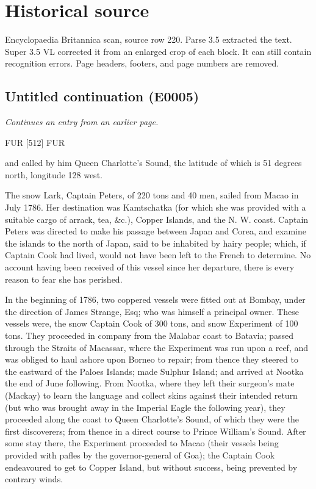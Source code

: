 \documentclass{article}
\begin{document}
\section*{Historical source}
Encyclopaedia Britannica scan, source row 220. Parse 3.5 extracted the text. Super 3.5 VL corrected it from an enlarged crop of each block. It can still contain recognition errors.
Page headers, footers, and page numbers are removed.

\subsection*{Untitled continuation (E0005)}
\textit{Continues an entry from an earlier page.}

FUR [512] FUR

and called by him Queen Charlotte's Sound, the latitude of which is 51 degrees north, longitude 128 west.

The snow Lark, Captain Peters, of 220 tons and 40 men, sailed from Macao in July 1786. Her destination was Kamtschatka (for which she was provided with a suitable cargo of arrack, tea, \&c.), Copper Islands, and the N. W. coast. Captain Peters was directed to make his passage between Japan and Corea, and examine the islands to the north of Japan, said to be inhabited by hairy people; which, if Captain Cook had lived, would not have been left to the French to determine. No account having been received of this vessel since her departure, there is every reason to fear she has perished.

In the beginning of 1786, two coppered vessels were fitted out at Bombay, under the direction of James Strange, Esq; who was himself a principal owner. These vessels were, the snow Captain Cook of 300 tons, and snow Experiment of 100 tons. They proceeded in company from the Malabar coast to Batavia; passed through the Straits of Macassar, where the Experiment was run upon a reef, and was obliged to haul ashore upon Borneo to repair; from thence they steered to the eastward of the Paloes Islands; made Sulphur Island; and arrived at Nootka the end of June following. From Nootka, where they left their surgeon's mate (Mackay) to learn the language and collect skins against their intended return (but who was brought away in the Imperial Eagle the following year), they proceeded along the coast to Queen Charlotte's Sound, of which they were the first discoverers; from thence in a direct course to Prince William's Sound. After some stay there, the Experiment proceeded to Macao (their vessels being provided with pafles by the governor-general of Goa); the Captain Cook endeavoured to get to Copper Island, but without success, being prevented by contrary winds.
\end{document}
